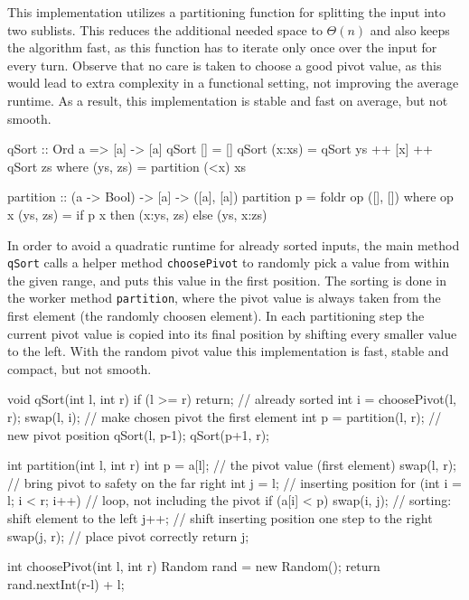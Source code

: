 \begin{impl} \label{impl:qshaskell}
This implementation utilizes a partitioning function for splitting the input into two sublists. This reduces the additional needed space to $\Theta(n)$ and also keeps the algorithm fast, as this function has to iterate only once over the input for every turn.
Observe that no care is taken to choose a good pivot value, as this would lead to extra complexity in a functional setting, not improving the average runtime. As a result, this implementation is stable and fast on average, but not smooth.
\end{impl}

\begin{haskellcode}
  qSort :: Ord a => [a] -> [a]
  qSort [] = []
  qSort (x:xs) = qSort ys ++ [x] ++ qSort zs
      where (ys, zs) = partition (<x) xs

  partition :: (a -> Bool) -> [a] -> ([a], [a])
  partition p = foldr op ([], [])
      where op x (ys, zs) = if p x then (x:ys, zs) else (ys, x:zs)
\end{haskellcode}

\begin{impl}
In order to avoid a quadratic runtime for already sorted inputs, the main method \texttt{qSort} calls a helper method \texttt{choosePivot} to randomly pick a value from within the given range, and puts this value in the first position.
The sorting is done in the worker method \texttt{partition}, where the pivot value is always taken from the first element (the randomly choosen element).
In each partitioning step the current pivot value is copied into its final position by shifting every smaller value to the left. With the random pivot value this implementation is fast, stable and compact, but not smooth.
\end{impl}

\begin{javacode}
void qSort(int l, int r) {
    if (l >= r) return; // already sorted
    int i = choosePivot(l, r);
    swap(l, i); // make chosen pivot the first element
    int p = partition(l, r); // new pivot position
    qSort(l, p-1);
    qSort(p+1, r);
}

int partition(int l, int r) {
    int p = a[l]; // the pivot value (first element)
    swap(l, r); // bring pivot to safety on the far right
    int j = l; // inserting position
    for (int i = l; i < r; i++) { // loop, not including the pivot
        if (a[i] < p) {
            swap(i, j); // sorting: shift element to the left
            j++; // shift inserting position one step to the right
        }
    }
    swap(j, r); // place pivot correctly
    return j;
}

int choosePivot(int l, int r) {
    Random rand = new Random();
    return rand.nextInt(r-l) + l;
}
\end{javacode}

